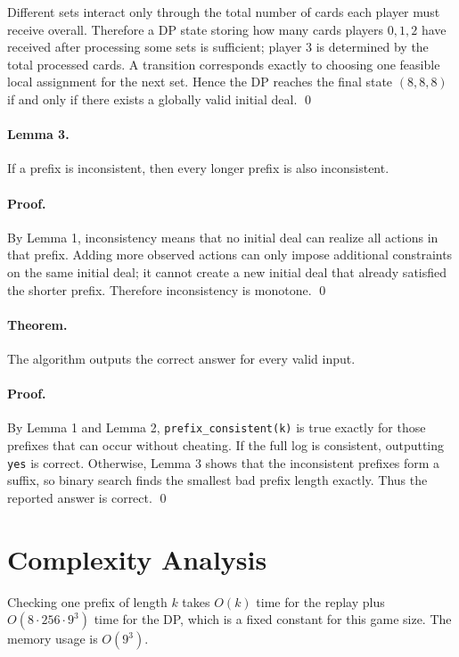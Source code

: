 \documentclass[11pt]{article}
\begin{document}
Different sets interact only through the total number of cards each player must receive overall.
Therefore a DP state storing how many cards players $0,1,2$ have received after processing some
sets is sufficient; player $3$ is determined by the total processed cards. A transition corresponds
exactly to choosing one feasible local assignment for the next set. Hence the DP reaches the final
state $(8,8,8)$ if and only if there exists a globally valid initial deal. \qed

\paragraph{Lemma 3.}
If a prefix is inconsistent, then every longer prefix is also inconsistent.

\paragraph{Proof.}
By Lemma 1, inconsistency means that no initial deal can realize all actions in that prefix. Adding
more observed actions can only impose additional constraints on the same initial deal; it cannot
create a new initial deal that already satisfied the shorter prefix. Therefore inconsistency is
monotone. \qed

\paragraph{Theorem.}
The algorithm outputs the correct answer for every valid input.

\paragraph{Proof.}
By Lemma 1 and Lemma 2, \texttt{prefix\_consistent(k)} is true exactly for those prefixes that can
occur without cheating. If the full log is consistent, outputting \texttt{yes} is correct. Otherwise,
Lemma 3 shows that the inconsistent prefixes form a suffix, so binary search finds the smallest bad
prefix length exactly. Thus the reported answer is correct. \qed

\section*{Complexity Analysis}

Checking one prefix of length $k$ takes $O(k)$ time for the replay plus
$O(8 \cdot 256 \cdot 9^3)$ time for the DP, which is a fixed constant for this game size. The memory
usage is $O(9^3)$.
\end{document}
